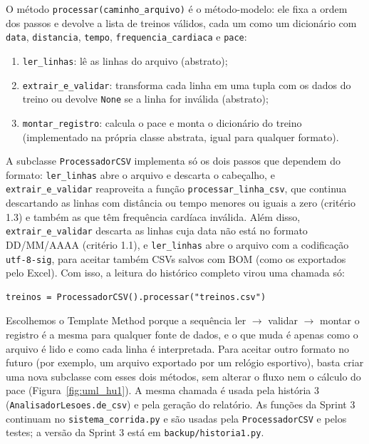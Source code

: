 \documentclass[12pt,a4paper]{article}
\begin{document}
O método \texttt{processar(caminho\_arquivo)} é o método-modelo: ele fixa a ordem dos
passos e devolve a lista de treinos válidos, cada um como um dicionário com
\texttt{data}, \texttt{distancia}, \texttt{tempo}, \texttt{frequencia\_cardiaca} e
\texttt{pace}:

\begin{enumerate}[itemsep=0.3em]
  \item \texttt{ler\_linhas}: lê as linhas do arquivo (abstrato);
  \item \texttt{extrair\_e\_validar}: transforma cada linha em uma tupla com os dados do
        treino ou devolve \texttt{None} se a linha for inválida (abstrato);
  \item \texttt{montar\_registro}: calcula o pace e monta o dicionário do treino
        (implementado na própria classe abstrata, igual para qualquer formato).
\end{enumerate}

A subclasse \texttt{ProcessadorCSV} implementa só os dois passos que dependem do formato:
\texttt{ler\_linhas} abre o arquivo e descarta o cabeçalho, e \texttt{extrair\_e\_validar}
reaproveita a função \texttt{processar\_linha\_csv}, que continua descartando as linhas com
distância ou tempo menores ou iguais a zero (critério 1.3) e também as que têm frequência
cardíaca inválida. Além disso, \texttt{extrair\_e\_validar} descarta as linhas cuja data
não está no formato DD/MM/AAAA (critério 1.1), e \texttt{ler\_linhas} abre o arquivo com
a codificação \texttt{utf-8-sig}, para aceitar também CSVs salvos com BOM (como os
exportados pelo Excel). Com isso, a leitura do histórico completo virou uma chamada só:

\begin{verbatim}
treinos = ProcessadorCSV().processar("treinos.csv")
\end{verbatim}

Escolhemos o Template Method porque a sequência ler $\rightarrow$ validar $\rightarrow$
montar o registro é a mesma para qualquer fonte de dados, e o que muda é apenas como o
arquivo é lido e como cada linha é interpretada. Para aceitar outro formato no futuro
(por exemplo, um arquivo exportado por um relógio esportivo), basta criar uma nova
subclasse com esses dois métodos, sem alterar o fluxo nem o cálculo do pace
(Figura~\ref{fig:uml_hu1}). A mesma chamada é usada pela história 3
(\texttt{AnalisadorLesoes.de\_csv}) e pela geração do relatório. As funções da Sprint 3
continuam no \texttt{sistema\_corrida.py} e são usadas pela \texttt{ProcessadorCSV} e
pelos testes; a versão da Sprint 3 está em \texttt{backup/historia1.py}.
\end{document}
